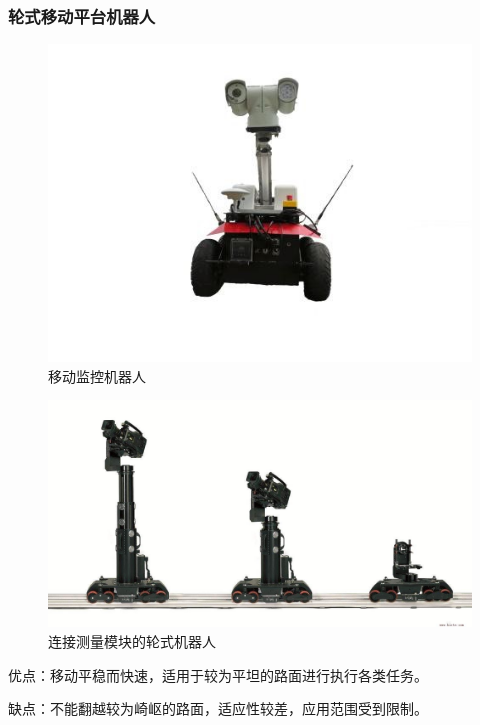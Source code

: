 \documentclass[12pt]{article}
\begin{document}
\begin{CJK}{UTF8}{gbsn}
\subsubsection{轮式移动平台机器人}
\renewcommand {\thefigure} {\thesubsection{}.\arabic{figure}}
\begin{figure}[H]
\centering
\includegraphics[width=.8\textwidth]{chap1//fig1.jpg}
\caption{移动监控机器人}
\end{figure}
\begin{figure}[H]
\centering
\includegraphics[width=.8\textwidth]{chap1//fig2.jpg}
\caption{连接测量模块的轮式机器人}
\end{figure}
优点：移动平稳而快速，适用于较为平坦的路面进行执行各类任务。\par
缺点：不能翻越较为崎岖的路面，适应性较差，应用范围受到限制。


\end{CJK}
\end{document}
